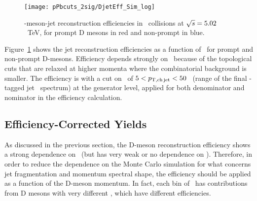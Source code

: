 \begin{figure}[bth]
\centering
\texttt{[image: pPbcuts\_2sig/DjetEff\_Sim\_log]}
\caption{\Dzero-meson-jet reconstruction efficiencies in \pp\ collisions at $\sqrt{s}=5.02$~TeV, for prompt D mesons in red and non-prompt in blue.}
\label{fig:eq_pp_DrecEff}
\end{figure}

Figure~\ref{fig:eq_pp_DrecEff} shows the \Dzero\-jet reconstruction efficiencies as a function of \ptd\, 
for prompt and non-prompt D-mesons. Efficiency depends strongly on \ptd\ because of the topological cuts that are relaxed at higher momenta where the combinatorial background is smaller. 
The efficiency is with a cut on \ptchjet\ of $5 < p_{\mathrm{T,ch\, jet}} < 50$ \GeVc\ (range of the final \Dzero-tagged jet \pt\ spectrum) at the generator level, applied for both denominator and nominator in the efficiency calculation.


\subsection{Efficiency-Corrected Yields}

As discussed in the previous section, the D-meson reconstruction efficiency shows a strong dependence on \ptd\ (but has very weak or no dependence on \ptjet).
Therefore, in order to reduce the dependence on the Monte Carlo simulation for what concerns jet fragmentation and momentum spectral shape,
the efficiency should be applied as a function of the D-meson momentum. In fact, each bin of \ptjet\ has contributions from D mesons with very different \ptd, which have different efficiencies.

